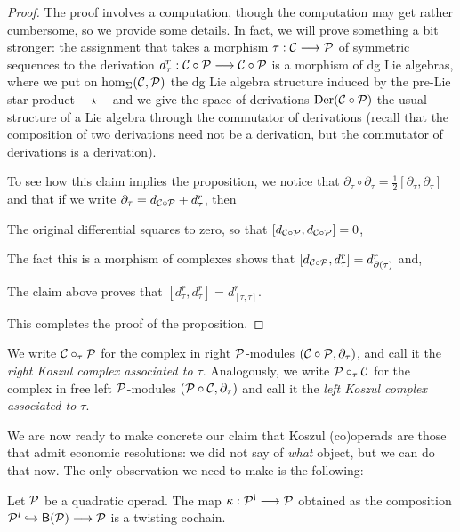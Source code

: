 \begin{proof}
The proof involves a computation, though the computation may get
rather cumbersome, so we provide some details. In fact, we will
prove something a bit stronger: the assignment that takes 
a morphism $\tau : \mathcal{C}\longrightarrow {\mathcal{P}}$ of symmetric
sequences to the derivation $d_\tau^r : \mathcal{C}\circ{\mathcal{P}} \longrightarrow
\mathcal{C}\circ {\mathcal{P}}$ is a morphism of dg Lie algebras, where we put
on $\hom_\Sigma(\mathcal{C},{\mathcal{P}})$ the dg Lie algebra structure induced by
the pre-Lie star product $-\star-$ and we give the space of
derivations $\operatorname{Der}(\mathcal{C}\circ{\mathcal{P}})$ the usual
structure of a Lie algebra through the commutator of
derivations (recall that the composition of two derivations
need not be a derivation, but the commutator of derivations
is a derivation).

To see how this claim implies the proposition, we notice
that $\partial_\tau\circ\partial_\tau = \frac{1}{2}[\partial_\tau,\partial_\tau]$
and that if we write $\partial_\tau = d_{\mathcal{C}\circ{\mathcal{P}}} + d_\tau^r$, then
\begin{tenumerate}
\item The original differential squares to zero, so that $[d_{\mathcal{C}\circ{\mathcal{P}}},d_{\mathcal{C}\circ{\mathcal{P}}}] = 0$,
\item The fact this is a morphism of complexes shows that $[d_{\mathcal{C}\circ{\mathcal{P}}},d_\tau^r] = d_{\partial(\tau)}^r$ and,
\item The claim above proves that $[d_\tau^r,d_\tau^r] = d_{[\tau,\tau]}^r$.
\end{tenumerate}
This completes the proof of the proposition.
\end{proof}

\begin{definition}
We write $\mathcal{C}\circ_\tau {\mathcal{P}}$ for the complex in right ${\mathcal{P}}$-modules
$(\mathcal{C}\circ {\mathcal{P}},\partial_\tau)$, and call it the \emph{right Koszul
complex associated to $\tau$}. Analogously, we write ${\mathcal{P}}\circ_\tau \mathcal{C}$
for the complex in free left ${\mathcal{P}}$-modules $({\mathcal{P}}\circ \mathcal{C},\partial_\tau)$
and call it the \emph{left Koszul complex associated to $\tau$}.
\end{definition}

We are now ready to make concrete our claim that Koszul (co)operads are
those that admit economic resolutions: we did not say of \emph{what}
object, but we can do that now. The only observation we need to make
is the following:

\begin{definition}
Let ${\mathcal{P}}$ be a quadratic operad. The map $\kappa : \PP^\antishriek
\longrightarrow \PP$ obtained as the composition
$\PP^\antishriek \hookrightarrow \B{\PP} \longrightarrow \PP$
is a twisting cochain.
\end{definition} 

